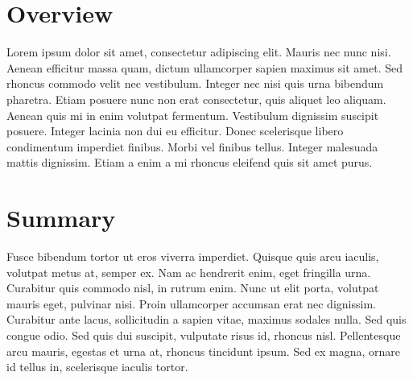 \section{Overview}
    Lorem ipsum dolor sit amet, consectetur adipiscing elit. Mauris nec nunc nisi. Aenean efficitur massa quam, dictum ullamcorper sapien maximus sit amet. Sed rhoncus commodo velit nec vestibulum. Integer nec nisi quis urna bibendum pharetra. Etiam posuere nunc non erat consectetur, quis aliquet leo aliquam. Aenean quis mi in enim volutpat fermentum. Vestibulum dignissim suscipit posuere. Integer lacinia non dui eu efficitur. Donec scelerisque libero condimentum imperdiet finibus. Morbi vel finibus tellus. Integer malesuada mattis dignissim. Etiam a enim a mi rhoncus eleifend quis sit amet purus.
    
\section{Summary}
   Fusce bibendum tortor ut eros viverra imperdiet. Quisque quis arcu iaculis, volutpat metus at, semper ex. Nam ac hendrerit enim, eget fringilla urna. Curabitur quis commodo nisl, in rutrum enim. Nunc ut elit porta, volutpat mauris eget, pulvinar nisi. Proin ullamcorper accumsan erat nec dignissim. Curabitur ante lacus, sollicitudin a sapien vitae, maximus sodales nulla. Sed quis congue odio. Sed quis dui suscipit, vulputate risus id, rhoncus nisl. Pellentesque arcu mauris, egestas et urna at, rhoncus tincidunt ipsum. Sed ex magna, ornare id tellus in, scelerisque iaculis tortor.